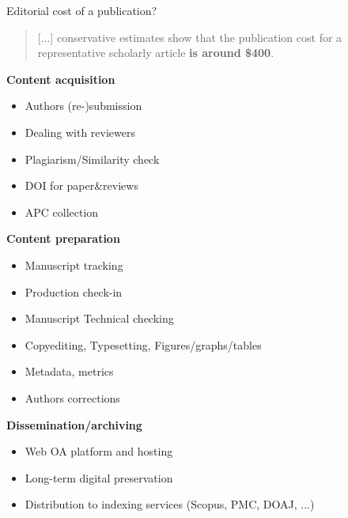\documentclass[10pt,compress,serif,aspectratio=169]{beamer}
\begin{document}
\begin{frame}[t]{Editorial cost of a publication?}
\begin{quote}
  \vspace{-.2cm}
   [...] conservative estimates show that the publication cost for a representative scholarly article \textbf{is around \$400}.
 \end{quote}

  \begin{minipage}{.45\textwidth}
   \textbf{Content acquisition}
   \begin{itemize}
   \item Authors (re-)submission
   \item Dealing with reviewers
   \item Plagiarism/Similarity check
   \item DOI for paper\&reviews
   \item APC collection
   \end{itemize}
 \end{minipage}
 \hfill
   \pause
 \begin{minipage}{.45\textwidth}
   \textbf{Content preparation}
   \begin{itemize}
   \item Manuscript tracking
   \item Production check-in
   \item Manuscript Technical checking
   \item Copyediting, Typesetting, Figures/graphs/tables
   \item Metadata, metrics
   \item Authors corrections
   \end{itemize}
\end{minipage}
\vfill
\pause
\begin{center}
 \begin{minipage}{.7\textwidth}
  \textbf{Dissemination/archiving}
  \begin{itemize}
  \item Web OA platform and hosting
  \item Long-term digital preservation
  \item Distribution to indexing services (Scopus, PMC, DOAJ, ...)
  \end{itemize}
\end{minipage}
\end{center}
\end{frame}


\end{document}
